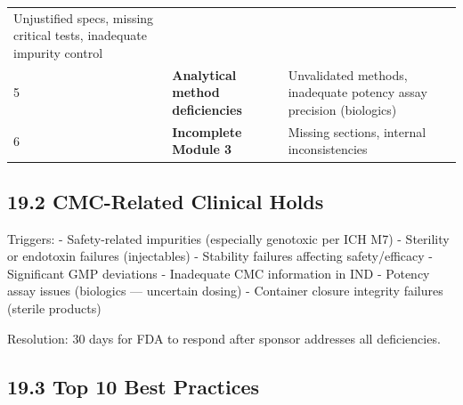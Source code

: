 \documentclass[
  11pt,
  a4paper,
]{report}
\begin{document}
\begin{longtable}[]{@{}lll@{}}
\begin{minipage}[t]{0.35\columnwidth}
Unjustified specs, missing critical tests, inadequate impurity
control\strut
\end{minipage}\tabularnewline
\begin{minipage}[t]{0.26\columnwidth}\raggedright
5\strut
\end{minipage} & \begin{minipage}[t]{0.30\columnwidth}\raggedright
\textbf{Analytical method deficiencies}\strut
\end{minipage} & \begin{minipage}[t]{0.35\columnwidth}\raggedright
Unvalidated methods, inadequate potency assay precision
(biologics)\strut
\end{minipage}\tabularnewline
\begin{minipage}[t]{0.26\columnwidth}\raggedright
6\strut
\end{minipage} & \begin{minipage}[t]{0.30\columnwidth}\raggedright
\textbf{Incomplete Module 3}\strut
\end{minipage} & \begin{minipage}[t]{0.35\columnwidth}\raggedright
Missing sections, internal inconsistencies\strut
\end{minipage}\tabularnewline
\bottomrule
\end{longtable}

\hypertarget{cmc-related-clinical-holds}{%
\subsection{19.2 CMC-Related Clinical
Holds}\label{cmc-related-clinical-holds}}

Triggers: - Safety-related impurities (especially genotoxic per ICH M7)
- Sterility or endotoxin failures (injectables) - Stability failures
affecting safety/efficacy - Significant GMP deviations - Inadequate CMC
information in IND - Potency assay issues (biologics --- uncertain
dosing) - Container closure integrity failures (sterile products)

Resolution: 30 days for FDA to respond after sponsor addresses all
deficiencies.

\hypertarget{top-10-best-practices}{%
\subsection{19.3 Top 10 Best Practices}\label{top-10-best-practices}}
\end{document}
